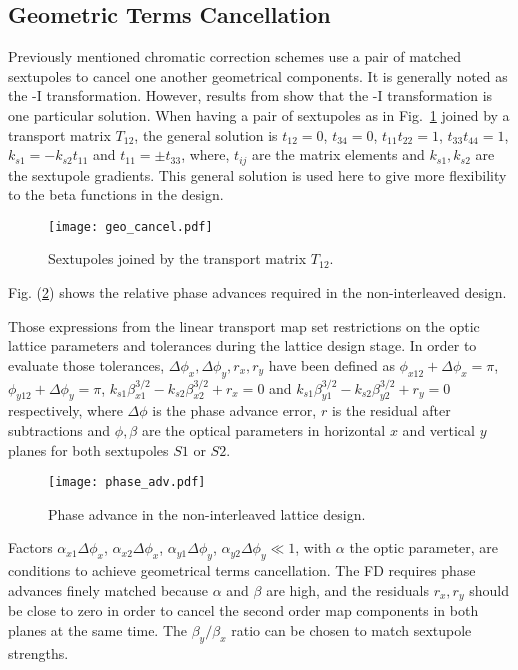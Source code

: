  \subsection{Geometric Terms Cancellation}
Previously mentioned chromatic correction schemes use a pair of matched sextupoles to cancel one another geometrical components. It is generally noted as the -I transformation. However, results from \cite{PhysRevSTAB.8.104002} show that the -I transformation is one particular solution. When having a pair of sextupoles as in Fig.~\ref{f:sext} joined by a transport matrix $T_{12}$, the general solution is $t_{12}=0$, $t_{34}=0$, $t_{11}t_{22}=1$, $t_{33}t_{44}=1$, $k_{s1}=-k_{s2}t_{11}$ and $t_{11}=\pm t_{33}$, where, $t_{ij}$ are the matrix elements and $k_{s1}, k_{s2}$ are the sextupole gradients. This general solution is used here to give more flexibility to the beta functions in the design. 
\begin{figure}[!htb]
   \centering
   \texttt{[image: geo\_cancel.pdf]}
   \caption{Sextupoles joined by the transport matrix $T_{12}$.}
   \label{f:sext}
\end{figure}
Fig. (\ref{f:phaseadv}) shows the relative phase advances required in the non-interleaved design.\par
Those expressions from the linear transport map set restrictions on the optic lattice parameters and tolerances during the lattice design stage. In order to evaluate those tolerances, $\Delta\phi_x, \Delta\phi_y, r_x, r_y$ have been defined as $\phi_{x12}+\Delta\phi_{x} = \pi$, $\phi_{y12}+\Delta\phi_{y} = \pi$, $ k_{s1}\beta_{x1}^{3/2}-k_{s2}\beta_{x2}^{3/2}+r_x=0$ and $k_{s1}\beta_{y1}^{3/2}-k_{s2}\beta_{y2}^{3/2}+r_y=0$ respectively, where $\Delta\phi$ is the phase advance error, $r$ is the residual after subtractions and $\phi,\beta$ are the optical parameters in horizontal $x$ and vertical $y$ planes for both sextupoles $S1$ or $S2$.\par
\begin{figure}[!htb]
   \centering
   \texttt{[image: phase\_adv.pdf]}
   \caption{Phase advance in the non-interleaved lattice design.}\label{f:phaseadv}
\end{figure}
Factors $\alpha_{x1}\Delta\phi_x$, $\alpha_{x2}\Delta\phi_x$, $\alpha_{y1}\Delta\phi_y$, $\alpha_{y2}\Delta\phi_y\ll1$, with $\alpha$ the optic parameter, are conditions to achieve geometrical terms cancellation. The FD requires phase advances finely matched because $\alpha$ and $\beta$ are high, and the residuals $r_x,r_y$ should be close to zero in order to cancel the second order map components in both planes at the same time. The $\beta_y/\beta_x$ ratio can be chosen to match sextupole strengths.\par

